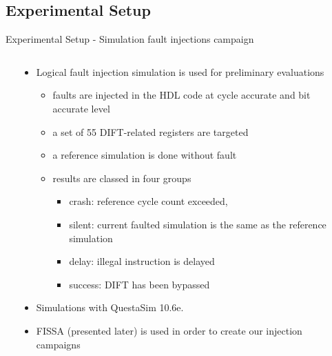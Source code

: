\subsection{Experimental Setup}
\begin{frame}{Experimental Setup - Simulation fault injections campaign}
    \begin{columns}
        \begin{column}{.125\linewidth}
            \hfill
        \end{column}
        \begin{column}{.75\linewidth}
            \begin{itemize}
                \justifying
                \item Logical fault injection simulation is used for preliminary evaluations
                      \begin{itemize}
                          \justifying
                          \item faults are injected in the HDL code at cycle accurate and bit accurate level
                          \item a set of 55 DIFT-related registers are targeted
                          \item a reference simulation is done without fault
                          \item results are classed in four groups
                                \begin{itemize}
                                    \justifying
                                    \item crash: reference cycle count exceeded,
                                    \item silent: current faulted simulation is the same as the reference simulation
                                    \item delay: illegal instruction is delayed
                                    \item success: DIFT has been bypassed
                                \end{itemize}
                      \end{itemize}
                \item Simulations with QuestaSim 10.6e.
                \item FISSA (presented later) is used in order to create our injection campaigns
            \end{itemize}
        \end{column}
        \begin{column}{.125\linewidth}
            \hfill
        \end{column}
    \end{columns}
\end{frame}

